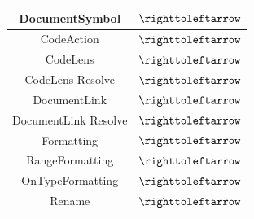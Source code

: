 \begin{figure}[H]
\begin{tabular}{|c|c|}
\hline
DocumentSymbol & $\righttoleftarrow$ \\
\hline
CodeAction & $\righttoleftarrow$ \\
\hline
CodeLens & $\righttoleftarrow$ \\
\hline
CodeLens Resolve & $\righttoleftarrow$ \\
\hline
DocumentLink & $\righttoleftarrow$ \\
\hline
DocumentLink Resolve & $\righttoleftarrow$ \\
\hline
Formatting & $\righttoleftarrow$ \\
\hline
RangeFormatting & $\righttoleftarrow$ \\
\hline
OnTypeFormatting & $\righttoleftarrow$ \\
\hline
Rename & $\righttoleftarrow$ \\
\hline
\end{tabular}
\end{figure}

